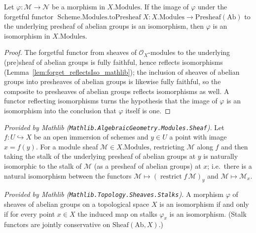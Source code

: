 \begin{lemma}\leanok
  \label{lem:isIso_modules_of_toPresheaf}
  Let \(\varphi : \mathcal{M} \to \mathcal{N}\) be a morphism in \(X.\mathrm{Modules}\). If the
  image of \(\varphi\) under the forgetful functor
  \(\operatorname{Scheme.Modules.toPresheaf} X : X.\mathrm{Modules} \to \mathrm{Presheaf}(\mathrm{Ab})\)
  to the underlying presheaf of abelian groups is an isomorphism, then \(\varphi\) is an
  isomorphism in \(X.\mathrm{Modules}\).
\end{lemma}
\begin{proof}
  The forgetful functor from sheaves of \(\mathcal{O}_X\)-modules to the underlying (pre)sheaf of
  abelian groups is fully faithful, hence reflects isomorphisms
  (Lemma~\ref{lem:forget_reflectsIso_mathlib}); the inclusion of sheaves of abelian groups into
  presheaves of abelian groups is likewise fully faithful, so the composite to presheaves of abelian
  groups reflects isomorphisms as well. A functor reflecting isomorphisms turns the hypothesis that
  the image of \(\varphi\) is an isomorphism into the conclusion that \(\varphi\) itself is one.
\end{proof}

\begin{lemma}
  \label{lem:restrictStalkNatIso_mathlib}
  \mathlibok
  \textit{Provided by Mathlib
  (\texttt{Mathlib.AlgebraicGeometry.Modules.Sheaf}).}
  Let \(f : U \hookrightarrow X\) be an open immersion of schemes and \(y \in U\) a point with
  image \(x = f(y)\). For a module sheaf \(\mathcal{M} \in X.\mathrm{Modules}\), restricting
  \(\mathcal{M}\) along \(f\) and then taking the stalk of the underlying presheaf of abelian
  groups at \(y\) is naturally isomorphic to the stalk of \(\mathcal{M}\) (as a presheaf of
  abelian groups) at \(x\); i.e.\ there is a natural isomorphism between the functors
  \(\mathcal{M} \mapsto (\operatorname{restrict} f\,\mathcal{M})_y\) and \(\mathcal{M} \mapsto
  \mathcal{M}_x\).
\end{lemma}

\begin{lemma}
  \label{lem:isIso_iff_stalkFunctor_map_iso_mathlib}
  \mathlibok
  \textit{Provided by Mathlib
  (\texttt{Mathlib.Topology.Sheaves.Stalks}).}
  A morphism \(\varphi\) of sheaves of abelian groups on a topological space \(X\) is an
  isomorphism if and only if for every point \(x \in X\) the induced map on stalks
  \(\varphi_x\) is an isomorphism. (Stalk functors are jointly conservative on
  \(\mathrm{Sheaf}(\mathrm{Ab}, X)\).)
\end{lemma}

